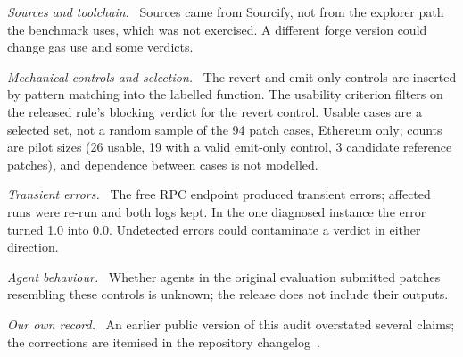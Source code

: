 \documentclass[conference]{IEEEtran}
\newcommand{\para}[1]{\textit{#1.}\ }
\begin{document}
\para{Sources and toolchain} Sources came from Sourcify, not from the explorer path the benchmark uses, which was not exercised. A different forge version could change gas use and some verdicts.

\para{Mechanical controls and selection} The revert and emit-only controls are inserted by pattern matching into the labelled function. The usability criterion filters on the released rule's blocking verdict for the revert control. Usable cases are a selected set, not a random sample of the 94 patch cases, Ethereum only; counts are pilot sizes (26 usable, 19 with a valid emit-only control, 3 candidate reference patches), and dependence between cases is not modelled.

\para{Transient errors} The free RPC endpoint produced transient errors; affected runs were re-run and both logs kept. In the one diagnosed instance the error turned 1.0 into 0.0. Undetected errors could contaminate a verdict in either direction.

\para{Agent behaviour} Whether agents in the original evaluation submitted patches resembling these controls is unknown; the release does not include their outputs.

\para{Our own record} An earlier public version of this audit overstated several claims; the corrections are itemised in the repository changelog~\cite{audit}.
\end{document}
